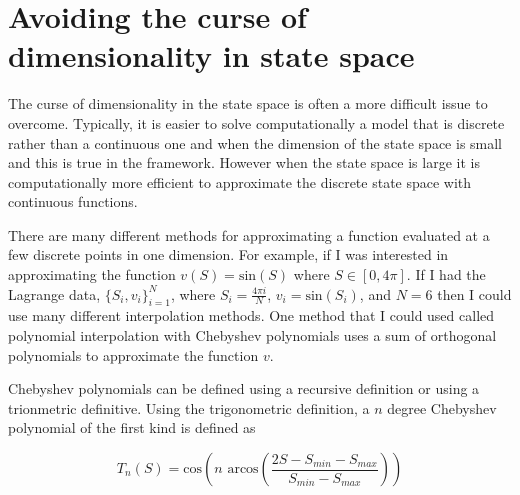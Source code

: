 \documentclass[12pt]{article}
\begin{document}
\section{Avoiding the curse of dimensionality in state space}
\label{state}

The curse of dimensionality in the state space is often a more difficult issue to overcome. Typically, it is easier to solve computationally a model that is discrete rather than a continuous one and when the dimension of the state space is small and this is true in the \citet{1995_Erickson_Pakes_RES} framework. However when the state space is large it is computationally more efficient to approximate the discrete state space with continuous functions.

There are many different methods for approximating a function evaluated at a few discrete points in one dimension. For example, if I was interested in approximating the function $v(S)=\text{sin}(S)$ where $S \in [0, 4\pi]$. If I had the Lagrange data, $\{S_i,v_i\}_{i=1}^N$, where $S_i=\frac{4\pi i}{N}$, $v_i=\text{sin}(S_i)$, and $N=6$ then I could use many different interpolation methods. One method that I could used called polynomial interpolation with Chebyshev polynomials uses a sum of orthogonal polynomials to approximate the function $v$.

Chebyshev polynomials can be defined using a recursive definition or using a trionmetric definitive. Using the trigonometric definition, a $n$ degree Chebyshev polynomial of the first kind is defined as

\begin{equation*}
  T_n(S)=\text{cos}(n \text{ arcos}(\frac{2S-S_{min}-S_{max}}{S_{min}-S_{max}}))
\end{equation*}
\end{document}
